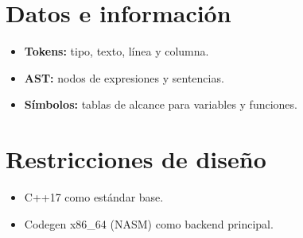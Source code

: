 \documentclass[11pt,a4paper]{article}
\begin{document}
\section{Datos e información}
\begin{itemize}
    \item \textbf{Tokens:} tipo, texto, línea y columna.
    \item \textbf{AST:} nodos de expresiones y sentencias.
    \item \textbf{Símbolos:} tablas de alcance para variables y funciones.
\end{itemize}

\section{Restricciones de diseño}
\begin{itemize}
    \item C++17 como estándar base.
    \item Codegen x86\_64 (NASM) como backend principal.
\end{itemize}
\end{document}
